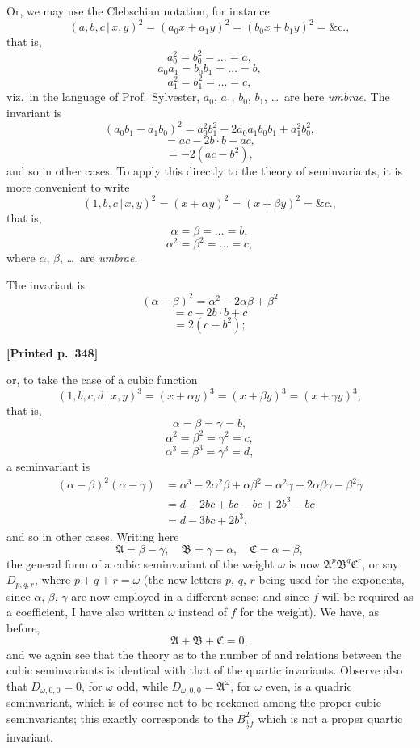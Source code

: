 \documentclass[11pt]{article}
\begin{document}
Or, we may use the Clebschian notation, for instance
\[
(a, b, c\,|\,x, y)^{2} = (a_{0}x + a_{1}y)^{2} = (b_{0}x + b_{1}y)^{2} = \text{\&c.},
\]
that is,
\[
a_{0}^{2} = b_{0}^{2} = \dots = a,
\]
\[
a_{0}a_{1} = b_{0}b_{1} = \dots = b,
\]
\[
a_{1}^{2} = b_{1}^{2} = \dots = c,
\]
viz.\ in the language of Prof.\ Sylvester, $a_{0}$, $a_{1}$, $b_{0}$, $b_{1}$, \dots\ are here \textit{umbrae}. The invariant is
\[
(a_{0}b_{1} - a_{1}b_{0})^{2} = a_{0}^{2}b_{1}^{2} - 2a_{0}a_{1}b_{0}b_{1} + a_{1}^{2}b_{0}^{2},
\]
\[
= ac - 2b\cdot b + ac,
\]
\[
= -2(ac - b^{2}),
\]
and so in other cases. To apply this directly to the theory of seminvariants, it is more convenient to write
\[
(1, b, c\,|\,x, y)^{2} = (x + \alpha y)^{2} = (x + \beta y)^{2} = \&c.,
\]
that is,
\[
\alpha = \beta = \dots = b,
\]
\[
\alpha^{2} = \beta^{2} = \dots = c,
\]
where $\alpha$, $\beta$, \dots\ are \textit{umbrae}.

The invariant is
\[
(\alpha - \beta)^{2} = \alpha^{2} - 2\alpha\beta + \beta^{2}
\]
\[
= c - 2b\cdot b + c
\]
\[
= 2(c - b^{2});
\]

\medskip

\noindent\textbf{[Printed p.~348]}\hfill

\noindent or, to take the case of a cubic function
\[
(1, b, c, d\,|\,x, y)^{3} = (x + \alpha y)^{3} = (x + \beta y)^{3} = (x + \gamma y)^{3},
\]
that is,
\[
\alpha = \beta = \gamma = b,
\]
\[
\alpha^{2} = \beta^{2} = \gamma^{2} = c,
\]
\[
\alpha^{3} = \beta^{3} = \gamma^{3} = d,
\]
a seminvariant is
\begin{align*}
(\alpha - \beta)^{2}(\alpha - \gamma) &= \alpha^{3} - 2\alpha^{2}\beta + \alpha\beta^{2} - \alpha^{2}\gamma + 2\alpha\beta\gamma - \beta^{2}\gamma \\
&= d - 2bc + bc - bc + 2b^{3} - bc \\
&= d - 3bc + 2b^{3},
\end{align*}
and so in other cases. Writing here
\[
\mathfrak{A} = \beta - \gamma,\quad \mathfrak{B} = \gamma - \alpha,\quad \mathfrak{C} = \alpha - \beta,
\]
the general form of a cubic seminvariant of the weight $\omega$ is now $\mathfrak{A}^{p}\mathfrak{B}^{q}\mathfrak{C}^{r}$, or say $D_{p, q, r}$, where $p + q + r = \omega$ (the new letters $p$, $q$, $r$ being used for the exponents, since $\alpha$, $\beta$, $\gamma$ are now employed in a different sense; and since $f$ will be required as a coefficient, I have also written $\omega$ instead of $f$ for the weight). We have, as before,
\[
\mathfrak{A} + \mathfrak{B} + \mathfrak{C} = 0,
\]
and we again see that the theory as to the number of and relations between the cubic seminvariants is identical with that of the quartic invariants. Observe also that $D_{\omega, 0, 0} = 0$, for $\omega$ odd, while $D_{\omega, 0, 0} = \mathfrak{A}^{\omega}$, for $\omega$ even, is a quadric seminvariant, which is of course not to be reckoned among the proper cubic seminvariants; this exactly corresponds to the $B_{\frac{1}{2}f}^{2}$ which is not a proper quartic invariant.
\end{document}
